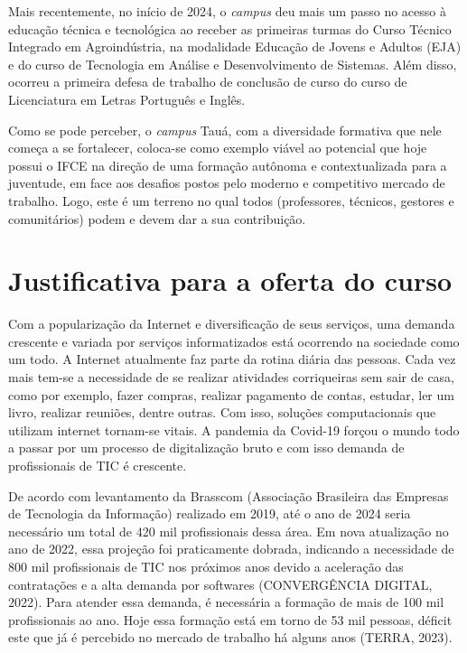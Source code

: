 Mais recentemente, no início de 2024, o \textit{campus} deu mais um passo no acesso à
educação técnica e tecnológica ao receber as primeiras turmas do Curso Técnico
Integrado em Agroindústria, na modalidade Educação de Jovens e Adultos (EJA) e do curso de Tecnologia em Análise e Desenvolvimento de Sistemas. 
Além disso, ocorreu a primeira defesa de trabalho de conclusão de curso do curso de Licenciatura em Letras Português e Inglês.


Como se pode perceber, o \textit{campus} Tauá, com a diversidade formativa que
nele começa a se fortalecer, coloca-se como exemplo viável ao potencial que hoje
possui o IFCE na direção de uma formação autônoma e contextualizada para a
juventude, em face aos desafios postos pelo moderno e competitivo mercado de
trabalho. Logo, este é um terreno no qual todos (professores, técnicos, gestores
e comunitários) podem e devem dar a sua contribuição.



\chapter{Justificativa para a oferta do curso}

Com a popularização da Internet e diversificação de seus serviços, uma demanda
crescente e variada por serviços informatizados está ocorrendo na sociedade como
um todo.  A Internet atualmente faz parte da rotina diária das pessoas. Cada vez
mais tem-se a necessidade de se realizar atividades corriqueiras sem sair de
casa, como por exemplo, fazer compras, realizar pagamento de contas, estudar,
ler um livro, realizar reuniões, dentre outras. Com isso, soluções
computacionais que utilizam internet tornam-se vitais. A pandemia da Covid-19 forçou o mundo todo a passar
por um processo de digitalização bruto e com isso demanda de profissionais de TIC é crescente. 

De acordo com levantamento
da Brasscom (Associação Brasileira das Empresas de Tecnologia da Informação)
realizado em 2019, até o ano de 2024 seria necessário um total de 420 mil
profissionais dessa área. Em nova atualização no ano de 2022, essa projeção foi
praticamente dobrada, indicando a necessidade de 800 mil profissionais de TIC nos
próximos anos devido a aceleração das contratações e a alta demanda por softwares
(CONVERGÊNCIA DIGITAL, 2022). Para atender essa demanda, é necessária a
formação de mais de 100 mil profissionais ao ano. Hoje essa formação está em torno
de 53 mil pessoas, déficit este que já é percebido no mercado de trabalho há alguns
anos (TERRA, 2023).


